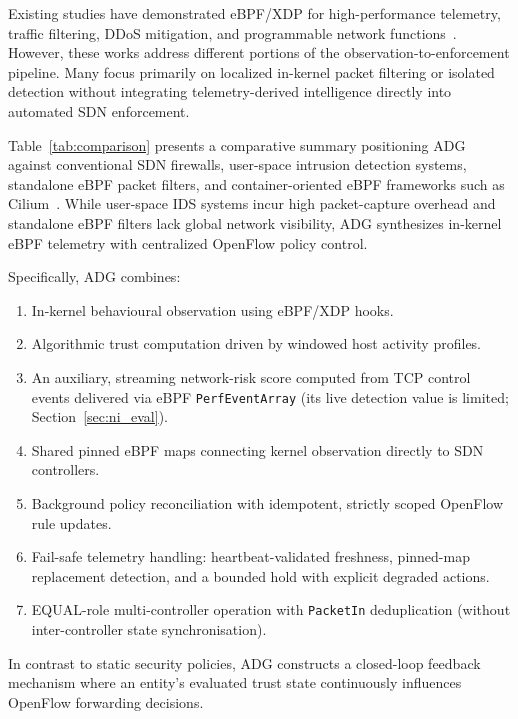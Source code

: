 \documentclass[conference]{IEEEtran}
\begin{document}
Existing studies have demonstrated eBPF/XDP for high-performance telemetry, traffic filtering, DDoS mitigation, and programmable network functions~\cite{hoiland2018express, miano2023sketching, tolay2025ebpf}. However, these works address different portions of the observation-to-enforcement pipeline. Many focus primarily on localized in-kernel packet filtering or isolated detection without integrating telemetry-derived intelligence directly into automated SDN enforcement.

Table~\ref{tab:comparison} presents a comparative summary positioning ADG against conventional SDN firewalls, user-space intrusion detection systems, standalone eBPF packet filters, and container-oriented eBPF frameworks such as Cilium~\cite{cilium2023}. While user-space IDS systems incur high packet-capture overhead and standalone eBPF filters lack global network visibility, ADG synthesizes in-kernel eBPF telemetry with centralized OpenFlow policy control.

Specifically, ADG combines:
\begin{enumerate}
\item In-kernel behavioural observation using eBPF/XDP hooks.
\item Algorithmic trust computation driven by windowed host activity profiles.
\item An auxiliary, streaming network-risk score computed from TCP control events delivered via eBPF \texttt{PerfEventArray} (its live detection value is limited; Section~\ref{sec:ni_eval}).
\item Shared pinned eBPF maps connecting kernel observation directly to SDN controllers.
\item Background policy reconciliation with idempotent, strictly scoped OpenFlow rule updates.
\item Fail-safe telemetry handling: heartbeat-validated freshness, pinned-map replacement detection, and a bounded hold with explicit degraded actions.
\item EQUAL-role multi-controller operation with \texttt{PacketIn} deduplication (without inter-controller state synchronisation).
\end{enumerate}

In contrast to static security policies, ADG constructs a closed-loop feedback mechanism where an entity's evaluated trust state continuously influences OpenFlow forwarding decisions.

\end{document}
